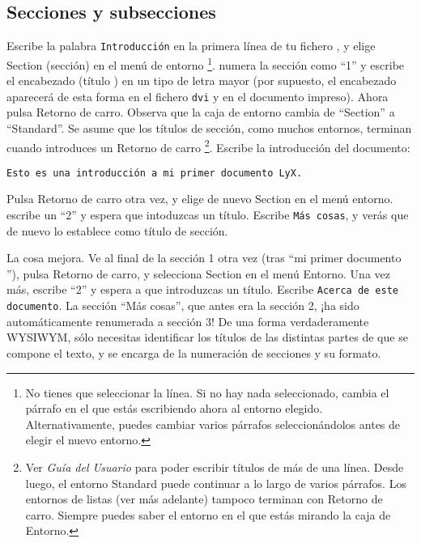 \subsection{Secciones y subsecciones}

Escribe la palabra \texttt{Introducción} en la primera línea de tu
fichero \LyX{}, y elige \textsf{Section} (sección) en el menú de entorno%
\footnote{No tienes que seleccionar la línea. Si no hay nada seleccionado, \LyX{}
cambia el párrafo en el que estás escribiendo ahora al entorno elegido.
Alternativamente, puedes cambiar varios párrafos seleccionándolos
antes de elegir el nuevo entorno.%
}. \LyX{} numera la sección como {}``1'' y escribe el encabezado
(título ) en un tipo de letra mayor (por supuesto, el encabezado aparecerá
de esta forma en el fichero \texttt{dvi} y en el documento impreso).
Ahora pulsa \textsf{Retorno de carro.} Observa que la caja de entorno
cambia de {}``Section'' a {}``Standard''. Se asume que los títulos
de sección, como muchos entornos, terminan cuando introduces un \textsf{Retorno
de carro}%
\footnote{Ver \emph{Guía del Usuario} para poder escribir títulos de más de
una línea. Desde luego, el entorno \textsf{Standard} puede continuar
a lo largo de varios párrafos. Los entornos de listas (ver más adelante)
tampoco terminan con \textsf{Retorno de carro.} Siempre puedes saber
el entorno en el que estás mirando la caja de \textsf{Entorno.}%
}\textsf{.} Escribe la introducción del documento:

\begin{verbatim}
Esto es una introducción a mi primer documento LyX.
\end{verbatim}

Pulsa \textsf{Retorno de carro} otra vez, y elige de nuevo \textsf{Section}
en el menú entorno. \LyX{} escribe un {}``2'' y espera que intoduzcas
un título. Escribe \texttt{Más cosas}, y verás que de nuevo lo establece
como título de sección.

La cosa mejora. Ve al final de la sección 1 otra vez (tras {}``mi
primer documento \LyX{}''), pulsa \textsf{Retorno de carro}, y selecciona
\textsf{Section} en el menú \textsf{Entorno}. Una vez más, \LyX{}
escribe {}``2'' y espera a que introduzcas un título. Escribe \texttt{Acerca
de este documento}. La sección {}``Más cosas'', que antes era la
sección 2, ¡ha sido automáticamente renumerada a sección 3! De una
forma verdaderamente WYSIWYM, sólo necesitas identificar los títulos
de las distintas partes de que se compone el texto, y \LyX{} se encarga
de la numeración de secciones y su formato.

